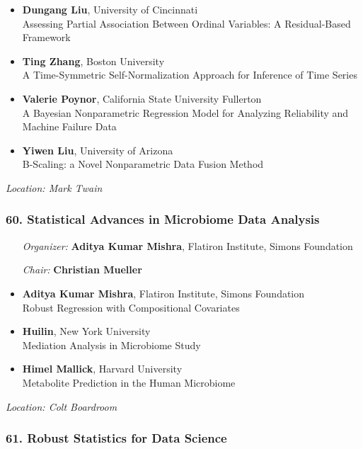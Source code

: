 \begin{itemize}
\item \textbf{Dungang Liu}, University of Cincinnati \\
Assessing Partial Association Between Ordinal Variables: A Residual-Based Framework
\item \textbf{Ting Zhang}, Boston University \\
A Time-Symmetric Self-Normalization Approach for Inference of Time Series
\item \textbf{Valerie Poynor}, California State University Fullerton \\
A Bayesian Nonparametric Regression Model for Analyzing Reliability and Machine Failure Data
\item \textbf{Yiwen Liu}, University of Arizona \\
B-Scaling: a Novel Nonparametric Data Fusion Method
\end{itemize}

\emph{Location: Mark Twain}

\subsubsection*{60. Statistical Advances in Microbiome Data Analysis}

\begin{enumerate}[align=left]
\item [\emph{Organizer:}] \textbf{Aditya Kumar Mishra}, Flatiron Institute, Simons Foundation
\item [\emph{Chair:}] \textbf{Christian Mueller}
\end{enumerate}

\begin{itemize}
\item \textbf{Aditya Kumar Mishra}, Flatiron Institute, Simons Foundation \\
Robust Regression with Compositional Covariates
\item \textbf{Huilin}, New York University \\
Mediation Analysis in Microbiome Study
\item \textbf{Himel Mallick}, Harvard University \\
Metabolite Prediction in the Human Microbiome
\end{itemize}

\emph{Location: Colt Boardroom}

\subsubsection*{61. Robust Statistics for Data Science}

